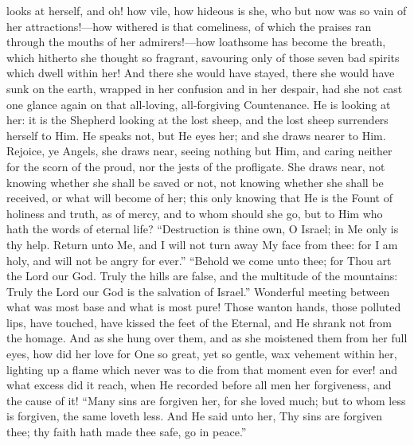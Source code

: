looks at herself, and oh! how vile, how hideous is she, who but now
was so vain of her attractions!—how withered is that comeliness, of
which the praises ran through the mouths of her admirers!—how
loathsome has become the breath, which hitherto she thought so
fragrant, savouring only of those seven bad spirits which dwell within
her! And there she would have stayed, there she would have sunk on the
earth, wrapped in her confusion and in her despair, had she not cast
one glance again on that all-loving, all-forgiving Countenance. He is
looking at her: it is the Shepherd looking at the lost sheep, and the
lost sheep surrenders herself to Him. He speaks not, but He eyes her;
and she draws nearer to Him. Rejoice, ye Angels, she draws near,
seeing nothing but Him, and caring neither for the scorn of the proud,
nor the jests of the profligate. She draws near, not knowing whether
she shall be saved or not, not knowing whether she shall be received,
or what will become of her; this only knowing that He is the Fount of
holiness and truth, as of mercy, and to whom should she go, but to Him
who hath the words of eternal life? ``Destruction is thine own, O
Israel; in Me only is thy help. Return unto Me, and I will not turn
away My face from thee: for I am holy, and will not be angry for
ever.'' ``Behold we come unto thee; for Thou art the Lord our
God. Truly the hills are false, and the multitude of the mountains:
Truly the Lord our God is the salvation of Israel.'' Wonderful
meeting between what was most base and what is most pure! Those wanton
hands, those polluted lips, have touched, have kissed the feet of the
Eternal, and He shrank not from the homage. And as she hung over them,
and as she moistened them from her full eyes, how did her love for One
so great, yet so gentle, wax vehement within her, lighting up a flame
which never was to die from that moment even for ever! and what excess
did it reach, when He recorded before all men her forgiveness, and the
cause of it! ``Many sins are forgiven her, for she loved much; but
to whom less is forgiven, the same loveth less. And He said unto her,
Thy sins are forgiven thee; thy faith hath made thee safe, go in
peace.''

